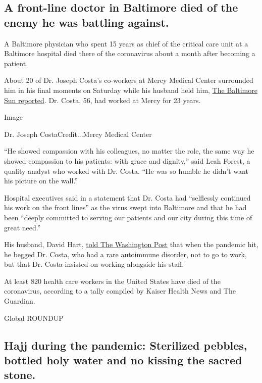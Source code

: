 \hypertarget{a-front-line-doctor-in-baltimore-died-of-the-enemy-he-was-battling-against}{%
\subsection{A front-line doctor in Baltimore died of the enemy he was
battling
against.}\label{a-front-line-doctor-in-baltimore-died-of-the-enemy-he-was-battling-against}}

A Baltimore physician who spent 15 years as chief of the critical care
unit at a Baltimore hospital died there of the coronavirus about a month
after becoming a patient.

About 20 of Dr. Joseph Costa's co-workers at Mercy Medical Center
surrounded him in his final moments on Saturday while his husband held
him,
\href{https://www.baltimoresun.com/coronavirus/bs-md-ob-cv-costa-icu-doctor-mercy-coronavirus-20200727-qbb4ebvnizdvtpkk4octd27tda-story.html}{The
Baltimore Sun reported}. Dr. Costa, 56, had worked at Mercy for 23
years.

Image

Dr. Joseph CostaCredit...Mercy Medical Center

``He showed compassion with his colleagues, no matter the role, the same
way he showed compassion to his patients: with grace and dignity,'' said
Leah Forest, a quality analyst who worked with Dr. Costa. ``He was so
humble he didn't want his picture on the wall.''

Hospital executives said in a statement that Dr. Costa had ``selflessly
continued his work on the front lines'' as the virus swept into
Baltimore and that he had been ``deeply committed to serving our
patients and our city during this time of great need.''

His husband, David Hart,
\href{https://www.washingtonpost.com/local/head-of-baltimore-hospitals-icu-dies-of-coronavirus/2020/07/27/3831bfb8-d052-11ea-8d32-1ebf4e9d8e0d_story.html}{told
The Washington Post} that when the pandemic hit, he begged Dr. Costa,
who had a rare autoimmune disorder, not to go to work, but that Dr.
Costa insisted on working alongside his staff.

At least 820 health care workers in the United States have died of the
coronavirus, according to a tally compiled by Kaiser Health News and The
Guardian.

Global ROUNDUP

\hypertarget{hajj-during-the-pandemic-sterilized-pebbles-bottled-holy-water-and-no-kissing-the-sacred-stone}{%
\subsection{Hajj during the pandemic: Sterilized pebbles, bottled holy
water and no kissing the sacred
stone.}\label{hajj-during-the-pandemic-sterilized-pebbles-bottled-holy-water-and-no-kissing-the-sacred-stone}}


